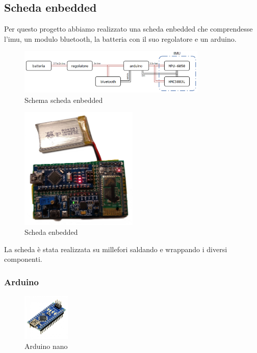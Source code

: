\documentclass[10pt,a4paper]{article}
\begin{document}
\clearpage
\subsection{Scheda enbedded}
Per questo progetto abbiamo realizzato una scheda enbedded che comprendesse l'imu, un modulo bluetooth, la batteria con il suo regolatore e un arduino. 

\begin{figure}[h]
	\centering
	\includegraphics[width=0.80\textwidth]{scheda.png}
	\vspace{-10pt}
	\caption{Schema scheda enbedded}
	\label{fig:schema_scheda}
\end{figure}

\begin{figure}[h]
	\centering
	\vspace{-10pt}
	\includegraphics[width=0.50\textwidth]{scheda.jpg}
	\vspace{-10pt}
	\caption{Scheda enbedded}
	\label{fig:scheda}
\end{figure}
La scheda \`e stata realizzata su millefori saldando e wrappando i diversi componenti.
\subsubsection{Arduino}

\begin{figure}
	\centering
	\vspace{-30pt}
	\includegraphics[width=0.2\textwidth]{arduino.jpg}
	\vspace{-30pt}
	\caption{Arduino nano}
	\label{fig:arduino_nano}
	\vspace{0pt}
\end{figure}
\end{document}
